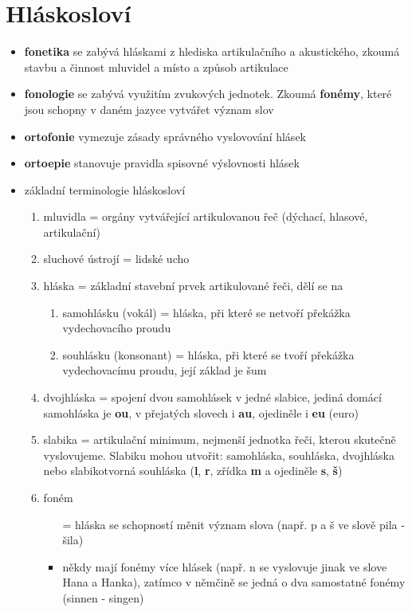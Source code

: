 \documentclass{memoir}
\begin{document}
\section*{Hláskosloví}
	\begin{itemize}
		\item \textbf{fonetika} se zabývá hláskami z hlediska artikulačního a akustického, zkoumá stavbu a činnost mluvidel a místo a způsob artikulace
		\item \textbf{fonologie} se zabývá využitím zvukových jednotek. Zkoumá \textbf{fonémy}, které jsou schopny v daném jazyce vytvářet význam slov
		\item \textbf{ortofonie} vymezuje zásady správného vyslovování hlásek
		\item \textbf{ortoepie} stanovuje pravidla spisovné výslovnosti hlásek
		\item základní terminologie hláskosloví
		\begin{enumerate}
			\item mluvidla = orgány vytvářející artikulovanou řeč (dýchací, hlasové, artikulační)
			\item sluchové ústrojí = lidské ucho
			\item hláska = základní stavební prvek artikulované řeči, dělí se na
			\begin{enumerate}
				\item samohlásku (vokál) = hláska, při které se netvoří překážka vydechovacího proudu
				\item souhlásku (konsonant) = hláska, při které se tvoří překážka vydechovacímu proudu, její základ je šum
			\end{enumerate}
			\item dvojhláska = spojení dvou samohlásek v jedné slabice, jediná domácí samohláska je \textbf{ou}, v přejatých slovech i \textbf{au}, ojediněle i \textbf{eu} (euro)
			\item slabika = artikulační minimum, nejmenší jednotka řeči, kterou skutečně vyslovujeme. Slabiku mohou utvořit: samohláska, souhláska, dvojhláska nebo slabikotvorná souhláska (\textbf{l}, \textbf{r}, zřídka \textbf{m} a ojediněle \textbf{s}, \textbf{š})
			\item foném
			\begin{itemize}
				\item[=] hláska se schopností měnit význam slova (např. p a š ve slově pila - šila)
				\item někdy mají fonémy více hlásek (např. n se vyslovuje jinak ve slove Hana a Hanka), zatímco v němčině se jedná o dva samostatné fonémy (sinnen - singen)

\end{itemize}
\end{enumerate}
\end{itemize}
\end{document}
